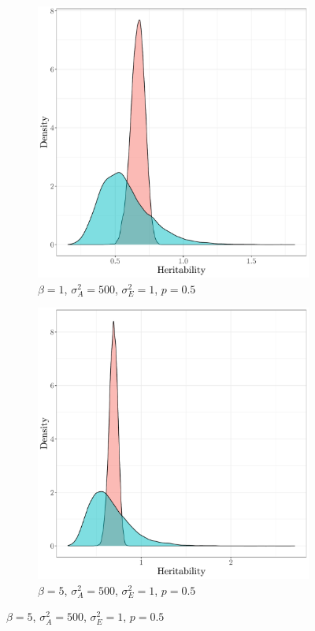 \begin{figure}
\begin{subfigure}{0.49\textwidth}
    \end{subfigure}
    \begin{subfigure}{0.49\textwidth}
    \caption{$\beta=1$, $\sigma^2_A=500$, $\sigma^2_E=1$, $p=0.5$}
    \includegraphics[width=\textwidth]{figures/fixedeffects_gaussian_probit_sA500_p_5_beta_1.pdf}
    \end{subfigure}
    \begin{subfigure}{0.49\textwidth}
    \caption{$\beta=5$, $\sigma^2_A=500$, $\sigma^2_E=1$, $p=0.5$}
    \includegraphics[width=\textwidth]{figures/fixedeffects_gaussian_probit_sA500_p_5_beta_5.pdf}

\end{subfigure}
\end{figure}
